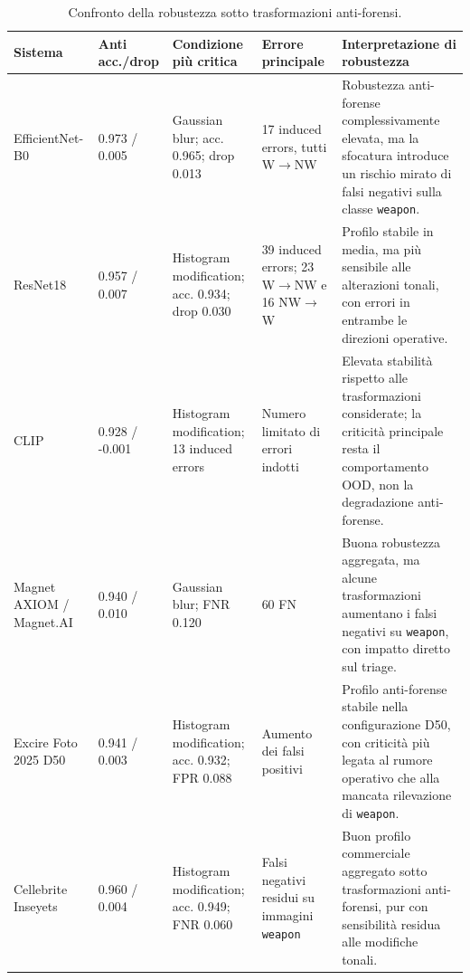 \begin{table}[H]
\centering
\caption{Confronto della robustezza sotto trasformazioni anti-forensi.}
\label{tab:results-comparative-antiforensic}
\small
\renewcommand{\arraystretch}{1.18}
\setlength{\tabcolsep}{3pt}
\begin{tabularx}{\textwidth}{@{}p{2.7cm} p{1.8cm} p{3.1cm} p{2.8cm} X@{}}
\toprule
\textbf{Sistema} &
\textbf{Anti acc./drop} &
\textbf{Condizione più critica} &
\textbf{Errore principale} &
\textbf{Interpretazione di robustezza} \\
\midrule

EfficientNet-B0 &
0.973 / 0.005 &
Gaussian blur; acc. 0.965; drop 0.013 &
17 induced errors, tutti W$\rightarrow$NW &
Robustezza anti-forense complessivamente elevata, ma la sfocatura introduce un
rischio mirato di falsi negativi sulla classe \texttt{weapon}. \\

ResNet18 &
0.957 / 0.007 &
Histogram modification; acc. 0.934; drop 0.030 &
39 induced errors; 23 W$\rightarrow$NW e 16 NW$\rightarrow$W &
Profilo stabile in media, ma più sensibile alle alterazioni tonali, con errori
in entrambe le direzioni operative. \\

CLIP &
0.928 / -0.001 &
Histogram modification; 13 induced errors &
Numero limitato di errori indotti &
Elevata stabilità rispetto alle trasformazioni considerate; la criticità
principale resta il comportamento OOD, non la degradazione anti-forense. \\

Magnet AXIOM / Magnet.AI &
0.940 / 0.010 &
Gaussian blur; FNR 0.120 &
60 FN &
Buona robustezza aggregata, ma alcune trasformazioni aumentano i falsi negativi
su \texttt{weapon}, con impatto diretto sul triage. \\

Excire Foto 2025 D50 &
0.941 / 0.003 &
Histogram modification; acc. 0.932; FPR 0.088 &
Aumento dei falsi positivi &
Profilo anti-forense stabile nella configurazione D50, con criticità più legata
al rumore operativo che alla mancata rilevazione di \texttt{weapon}. \\

Cellebrite Inseyets &
0.960 / 0.004 &
Histogram modification; acc. 0.949; FNR 0.060 &
Falsi negativi residui su immagini \texttt{weapon} &
Buon profilo commerciale aggregato sotto trasformazioni anti-forensi, pur
con sensibilità residua alle modifiche tonali. \\


\end{tabularx}
\end{table}
